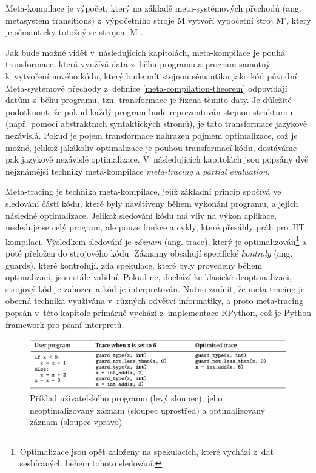 \documentclass[
  master,
  biblatex,
  figures=true,
  theorems,
  sourcecodes,
  glossaries,
  index
]{kidiplom}
\begin{document}
\begin{definition} 
\label{meta-compilation-theorem}
Meta-kompilace je výpočet, který na základě meta-systémových přechodů (ang. metasystem transitions) z~výpočetního stroje M vytvoří výpočetní stroj M', který je sémanticky totožný se strojem M \cite{metacompilation}.
\end{definition}

Jak bude možné vidět v~následujících kapitolách, meta-kompilace je pouhá transformace, která využívá data z~běhu programu a program samotný k~vytvoření nového kódu, který bude mít stejnou sémantiku jako kód původní. Meta-systémové přechody z~definice \ref{meta-compilation-theorem} odpovídají datům z~běhu programu, tzn. transformace je řízena těmito daty. Je důležité podotknout, že pokud každý program bude reprezentován stejnou strukturou (např. pomocí abstraktních syntaktických stromů), je tato transformace jazykově nezávislá. Pokud je pojem transformace nahrazen pojmem optimalizace, což je možné, jelikož jakákoliv optimalizace je pouhou transformací kódu, dostáváme pak jazykově nezávislé optimalizace. V~následujících kapitolách jsou popsány dvě nejznámější techniky meta-kompilace \textit{meta-tracing} a \textit{partial evaluation}. 


\label{meta-tracing-chapter}
Meta-tracing je technika meta-kompilace, jejíž základní princip spočívá ve sledování částí kódu, které byly navštíveny během vykonání programu, a jejich následné optimalizace. Jelikož sledování kódu má vliv na výkon aplikace, nesleduje se celý program, ale pouze funkce a cykly, které přesáhly práh pro JIT kompilaci. Výsledkem sledování je \textit{záznam} (ang. trace), který je optimalizován\footnote{Optimalizace jsou opět založeny na spekulacích, které vychází z~dat sesbíraných během tohoto sledování.} a poté přeložen do strojového kódu. Záznamy obsahují specifické \textit{kontroly} (ang. guards), které kontrolují, zda spekulace, které byly provedeny během optimalizací, jsou stále validní. Pokud ne, dochází ke klasické deoptimalizaci, strojový kód je zahozen a kód je interpretován. Nutno zmínit, že meta-tracing je obecná technika využívána v~různých odvětví informatiky, a proto meta-tracing popsán v~této kapitole primárně vychází z~implementace RPython, což je Python framework pro psaní interpretů. 


\begin{figure} [h]
    \centering
    \includegraphics[width= 1\textwidth]{images/meta-tracing2.png}
    \caption{Příklad uživatelského programu (levý sloupec), jeho neoptimalizovaný záznam (sloupec uprostřed) a optimalizovaný záznam (sloupec vpravo) \cite{meta-tracing}}
    \label{fig:meta-tracking-example}
\end{figure}
\end{document}

